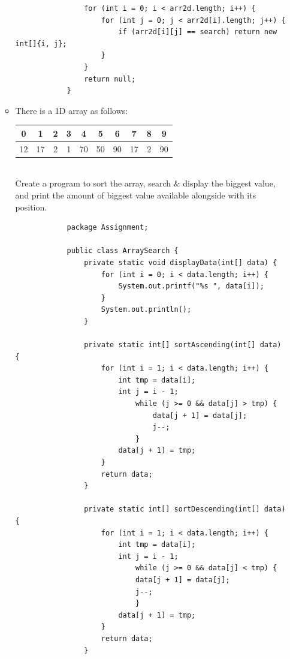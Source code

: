 \documentclass[12pt,titlepage]{article}
\begin{document}
\begin{enumerate}
\begin{itemize}
\begin{verbatim}
                for (int i = 0; i < arr2d.length; i++) {
                    for (int j = 0; j < arr2d[i].length; j++) {
                        if (arr2d[i][j] == search) return new int[]{i, j};
                    }
                }
                return null;
            }
        \end{verbatim}
        \item There is a 1D array as follows:
        \mbox{}\\
        \begin{tabular}{|c|c|c|c|c|c|c|c|c|c|}
            \hline
            0  & 1  & 2  & 3 & 4  & 5  & 6  & 7  & 8 & 9 \\
            \hline
            12 & 17 & 2  & 1 & 70 & 50 & 90 & 17 & 2 & 90 \\
            \hline
        \end{tabular}
        \mbox{}\\
        Create a program to sort the array, search \& display the biggest value, and print the amount of biggest value available alongside with its position.
        \begin{verbatim}
            package Assignment;

            public class ArraySearch {
                private static void displayData(int[] data) {
                    for (int i = 0; i < data.length; i++) {
                        System.out.printf("%s ", data[i]);
                    }
                    System.out.println();
                }

                private static int[] sortAscending(int[] data) {
                    for (int i = 1; i < data.length; i++) {
                        int tmp = data[i];
                        int j = i - 1;
                            while (j >= 0 && data[j] > tmp) {
                                data[j + 1] = data[j];
                                j--;
                            }
                        data[j + 1] = tmp;
                    }
                    return data;
                }

                private static int[] sortDescending(int[] data) {
                    for (int i = 1; i < data.length; i++) {
                        int tmp = data[i];
                        int j = i - 1;
                            while (j >= 0 && data[j] < tmp) {
                            data[j + 1] = data[j];
                            j--;
                            }
                        data[j + 1] = tmp;
                    }
                    return data;
                }


\end{verbatim}
\end{itemize}
\end{enumerate}
\end{document}
